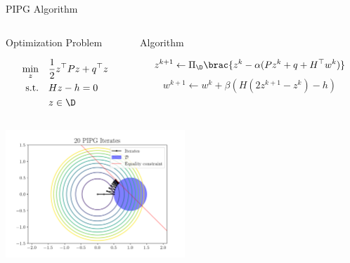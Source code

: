 \documentclass[aspectratio=169]{beamer}
\begin{document}
\begin{frame}{PIPG Algorithm}
    \vspace{-0.5cm}
    \begin{columns}[T]
        \begin{column}{.4\textwidth}
            \begin{block}{Optimization Problem}
                \begin{fleqn}
                    \begin{equation*}
                        \begin{aligned}
                        \min_{z} \quad & \frac{1}{2}z^{\top}Pz+q^\top z\\
                        \textrm{s.t.} \quad & Hz - h = 0\\
                          &z \in \D    \\
                        \end{aligned}
                    \end{equation*}
                \end{fleqn}
        \end{block}
        \end{column}
        \begin{column}{.6\textwidth}
            \begin{block}{Algorithm}
                    \begin{fleqn}
                            \begin{equation*}
                                z^{k+1} \gets \Pi_\D \brac{z^k - \alpha (Pz^k + q + H ^ \top w^k)}
                            \end{equation*}
                            \vspace*{-0.5cm}
                            \begin{equation*}
                                w^{k+1} \gets w^k + \beta(H(2z^{k+1}-z^k) - h)
                            \end{equation*}
                    \end{fleqn}
            \end{block}
        \end{column}
    \end{columns}
    \vspace{0.25cm}
    \begin{columns}[T]
        \begin{column}{.5\textwidth}
            \includegraphics[width=6.75cm]{img/pipg_iterates.png}

\end{column}
\end{columns}
\end{frame}
\end{document}
